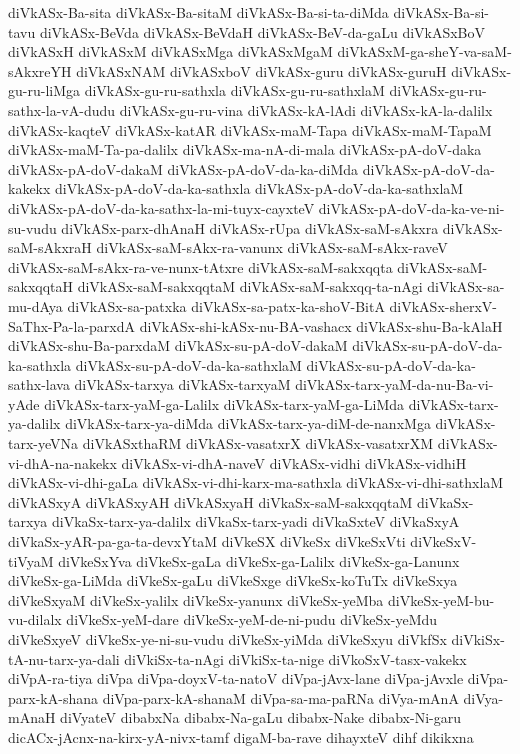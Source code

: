 {diVkASx-Ba-sita
diVkASx-Ba-sitaM
diVkASx-Ba-si-ta-diMda
diVkASx-Ba-si-tavu
diVkASx-BeVda
diVkASx-BeVdaH
diVkASx-BeV-da-gaLu
diVkASxBoV
diVkASxH
diVkASxM
diVkASxMga
diVkASxMgaM
diVkASxM-ga-sheY-va-saM-sAkxreYH
diVkASxNAM
diVkASxboV
diVkASx-guru
diVkASx-guruH
diVkASx-gu-ru-liMga
diVkASx-gu-ru-sathxla
diVkASx-gu-ru-sathxlaM
diVkASx-gu-ru-sathx-la-vA-dudu
diVkASx-gu-ru-vina
diVkASx-kA-lAdi
diVkASx-kA-la-dalilx
diVkASx-kaqteV
diVkASx-katAR
diVkASx-maM-Tapa
diVkASx-maM-TapaM
diVkASx-maM-Ta-pa-dalilx
diVkASx-ma-nA-di-mala
diVkASx-pA-doV-daka
diVkASx-pA-doV-dakaM
diVkASx-pA-doV-da-ka-diMda
diVkASx-pA-doV-da-kakekx
diVkASx-pA-doV-da-ka-sathxla
diVkASx-pA-doV-da-ka-sathxlaM
diVkASx-pA-doV-da-ka-sathx-la-mi-tuyx-cayxteV
diVkASx-pA-doV-da-ka-ve-ni-su-vudu
diVkASx-parx-dhAnaH
diVkASx-rUpa
diVkASx-saM-sAkxra
diVkASx-saM-sAkxraH
diVkASx-saM-sAkx-ra-vanunx
diVkASx-saM-sAkx-raveV
diVkASx-saM-sAkx-ra-ve-nunx-tAtxre
diVkASx-saM-sakxqqta
diVkASx-saM-sakxqqtaH
diVkASx-saM-sakxqqtaM
diVkASx-saM-sakxqq-ta-nAgi
diVkASx-sa-mu-dAya
diVkASx-sa-patxka
diVkASx-sa-patx-ka-shoV-BitA
diVkASx-sherxV-SaThx-Pa-la-parxdA
diVkASx-shi-kASx-nu-BA-vashacx
diVkASx-shu-Ba-kAlaH
diVkASx-shu-Ba-parxdaM
diVkASx-su-pA-doV-dakaM
diVkASx-su-pA-doV-da-ka-sathxla
diVkASx-su-pA-doV-da-ka-sathxlaM
diVkASx-su-pA-doV-da-ka-sathx-lava
diVkASx-tarxya
diVkASx-tarxyaM
diVkASx-tarx-yaM-da-nu-Ba-vi-yAde
diVkASx-tarx-yaM-ga-Lalilx
diVkASx-tarx-yaM-ga-LiMda
diVkASx-tarx-ya-dalilx
diVkASx-tarx-ya-diMda
diVkASx-tarx-ya-diM-de-nanxMga
diVkASx-tarx-yeVNa
diVkASxthaRM
diVkASx-vasatxrX
diVkASx-vasatxrXM
diVkASx-vi-dhA-na-nakekx
diVkASx-vi-dhA-naveV
diVkASx-vidhi
diVkASx-vidhiH
diVkASx-vi-dhi-gaLa
diVkASx-vi-dhi-karx-ma-sathxla
diVkASx-vi-dhi-sathxlaM
diVkASxyA
diVkASxyAH
diVkASxyaH
diVkaSx-saM-sakxqqtaM
diVkaSx-tarxya
diVkaSx-tarx-ya-dalilx
diVkaSx-tarx-yadi
diVkaSxteV
diVkaSxyA
diVkaSx-yAR-pa-ga-ta-devxYtaM
diVkeSX
diVkeSx
diVkeSxVti
diVkeSxV-tiVyaM
diVkeSxYva
diVkeSx-gaLa
diVkeSx-ga-Lalilx
diVkeSx-ga-Lanunx
diVkeSx-ga-LiMda
diVkeSx-gaLu
diVkeSxge
diVkeSx-koTuTx
diVkeSxya
diVkeSxyaM
diVkeSx-yalilx
diVkeSx-yanunx
diVkeSx-yeMba
diVkeSx-yeM-bu-vu-dilalx
diVkeSx-yeM-dare
diVkeSx-yeM-de-ni-pudu
diVkeSx-yeMdu
diVkeSxyeV
diVkeSx-ye-ni-su-vudu
diVkeSx-yiMda
diVkeSxyu
diVkfSx
diVkiSx-tA-nu-tarx-ya-dali
diVkiSx-ta-nAgi
diVkiSx-ta-nige
diVkoSxV-tasx-vakekx
diVpA-ra-tiya
diVpa
diVpa-doyxV-ta-natoV
diVpa-jAvx-lane
diVpa-jAvxle
diVpa-parx-kA-shana
diVpa-parx-kA-shanaM
diVpa-sa-ma-paRNa
diVya-mAnA
diVya-mAnaH
diVyateV
dibabxNa
dibabx-Na-gaLu
dibabx-Nake
dibabx-Ni-garu
dicACx-jAcnx-na-kirx-yA-nivx-tamf
digaM-ba-rave
dihayxteV
dihf
dikikxna
}
